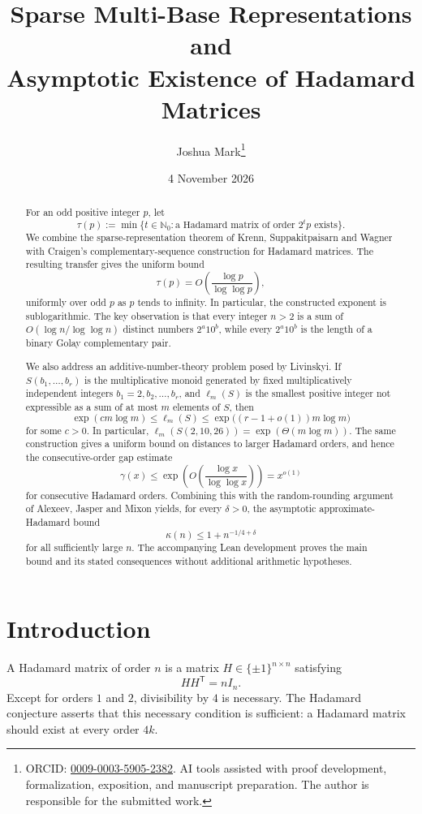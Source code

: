 \documentclass[11pt]{article}
\title{\textbf{Sparse Multi-Base Representations and\\Asymptotic Existence of Hadamard Matrices}}
\author{Joshua Mark\thanks{ORCID: \href{https://orcid.org/0009-0003-5905-2382}{0009-0003-5905-2382}. AI tools assisted with proof development, formalization, exposition, and manuscript preparation. The author is responsible for the submitted work.}}
\date{4 November 2026}
\newcommand{\N}{\mathbb{N}}
\begin{document}
\maketitle

\begin{abstract}
For an odd positive integer $p$, let
\[
\tau(p):=\min\{t\in\N_0: \text{a Hadamard matrix of order }2^t p\text{ exists}\}.
\]
We combine the sparse-representation theorem of Krenn, Suppakitpaisarn and Wagner with Craigen's complementary-sequence construction for Hadamard matrices.  The resulting transfer gives the uniform bound
\[
\tau(p)=O\!\left(\frac{\log p}{\log\log p}\right),
\]
uniformly over odd $p$ as $p$ tends to infinity. In particular, the constructed exponent is sublogarithmic.  The key observation is that every integer $n>2$ is a sum of $O(\!\log n/\log\log n)$ distinct numbers $2^a10^b$, while every $2^a10^b$ is the length of a binary Golay complementary pair.

We also address an additive-number-theory problem posed by Livinskyi.  If $S(b_1,\ldots,b_r)$ is the multiplicative monoid generated by fixed multiplicatively independent integers $b_1=2,b_2,\ldots,b_r$, and $\ell_m(S)$ is the smallest positive integer not expressible as a sum of at most $m$ elements of $S$, then
\[
\exp(c m\log m)\le \ell_m(S)\le
\exp\bigl((r-1+o(1))m\log m\bigr)
\]
for some $c>0$.  In particular,
$\ell_m(S(2,10,26))=\exp(\Theta(m\log m))$.
The same construction gives a uniform bound on distances to larger Hadamard orders, and hence the consecutive-order gap estimate
\[
\gamma(x)\le \exp\!\left(O\!\left(\frac{\log x}{\log\log x}\right)\right)=x^{o(1)}
\]
for consecutive Hadamard orders.  Combining this with the random-rounding argument of Alexeev, Jasper and Mixon yields, for every $\delta>0$, the asymptotic approximate-Hadamard bound
\[
\kappa(n)\le 1+n^{-1/4+\delta}
\]
for all sufficiently large $n$. The accompanying Lean development proves the main bound and its stated consequences without additional arithmetic hypotheses.
\end{abstract}

\section{Introduction}
A Hadamard matrix of order $n$ is a matrix $H\in\{\pm1\}^{n\times n}$ satisfying
\[
HH^{\mathsf T}=nI_n.
\]
Except for orders $1$ and $2$, divisibility by $4$ is necessary.  The Hadamard conjecture asserts that this necessary condition is sufficient: a Hadamard matrix should exist at every order $4k$.
\end{document}
